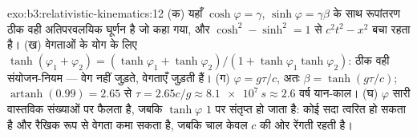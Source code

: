 \begin{solution}{exo:b3:relativistic-kinematics:12}
(क) यहाँ $\cosh\varphi = \gamma$, $\sinh\varphi = \gamma\beta$ के साथ
रूपांतरण ठीक वही अतिपरवलयिक घूर्णन है जो कहा गया, और
$\cosh^2 - \sinh^2 = 1$ से $c^2t^2 - x^2$ बचा रहता है। (ख) वेगताओं के
योग के लिए $\tanh(\varphi_1 + \varphi_2) = (\tanh\varphi_1 + \tanh\varphi_2)/(1 +
\tanh\varphi_1\tanh\varphi_2)$: ठीक वही संयोजन-नियम ---
वेग नहीं जुड़ते, वेगताएँ जुड़ती हैं। (ग) $\varphi = g\tau/c$, अतः
$\beta = \tanh(g\tau/c)$; $\operatorname{artanh}(0.99) = 2.65$ से
$\tau = 2.65c/g \approx \qty{8.1e7}{s} \approx 2.6$ वर्ष यान-काल।
(घ) $\varphi$ सारी वास्तविक संख्याओं पर फैलता है, जबकि $\tanh\varphi$
$1$ पर संतृप्त हो जाता है: कोई सदा त्वरित हो सकता है और रैखिक रूप से
वेगता कमा सकता है, जबकि चाल केवल $c$ की ओर रेंगती रहती है।
\end{solution}

